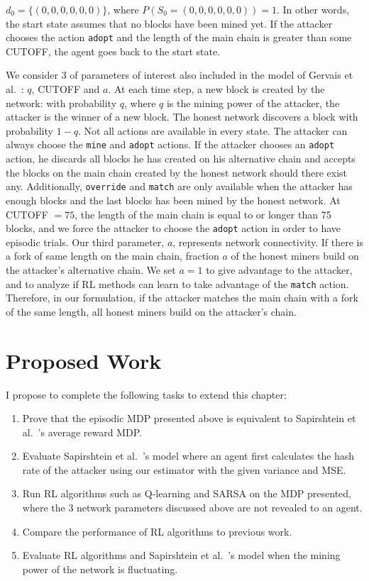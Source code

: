  $d_0 = \{(0, 0, 0, 0, 0, 0)\}$, where $P(S_0 = (0, 0, 0, 0, 0, 0)) = 1$. In other words, the start state assumes that no blocks have been mined yet. If the attacker chooses the action \texttt{adopt} and the length of the main chain is greater than some CUTOFF, the agent goes back to the start state.

 We consider 3 of parameters of interest also included in the model of Gervais et al.~\cite{Gervais:2016}: $q$, CUTOFF and $a$. At each time step, a new block is created by the network: with probability $q$, where $q$ is the mining power of the attacker, the attacker is the winner of a new block. The honest network discovers a block with probability $1-q$. Not all actions are available in every state. The attacker can always choose the \texttt{mine} and \texttt{adopt} actions. If the attacker chooses an {\tt adopt} action, he discards all blocks he has created on his alternative chain and accepts the blocks on the main chain created by the honest network should there exist any. Additionally, \texttt{override} and \texttt{match} are only available when the attacker has enough blocks and the last blocks has been mined by the honest network. At CUTOFF $= 75$, the length of the main chain is equal to or longer than 75 blocks, and we force the attacker to choose the \texttt{adopt} action in order to have episodic trials. Our third parameter, $a$, represents network connectivity. If there is a fork of same length on the main chain, fraction $a$ of the honest miners build on the attacker's alternative chain. We set $a=1$ to give advantage to the attacker, and to analyze if RL methods can learn to take advantage of the \texttt{match} action. Therefore, in our formulation, if the attacker matches the main chain with a fork of the same length, all honest miners build on the attacker's chain. 

\section{Proposed Work}\label{section:selfishRL-proposed-work}
I propose to complete the following tasks to extend this chapter:
\begin{enumerate}
\item Prove that the episodic MDP presented above is equivalent to Sapirshtein et al.~\cite{sapirshtein:2015}'s average reward MDP.
\item Evaluate Sapirshtein et al.~\cite{sapirshtein:2015}'s model where an agent first calculates the hash rate of the attacker using our estimator with the given variance and MSE.
\item Run RL algorithms such as Q-learning and SARSA on the MDP presented, where the 3 network parameters discussed above are not revealed to an agent.
\item Compare the performance of RL algorithms to previous work.
\item Evaluate RL algorithms and Sapirshtein et al.~\cite{sapirshtein:2015}'s model when the mining power of the network is fluctuating.
\end{enumerate}

